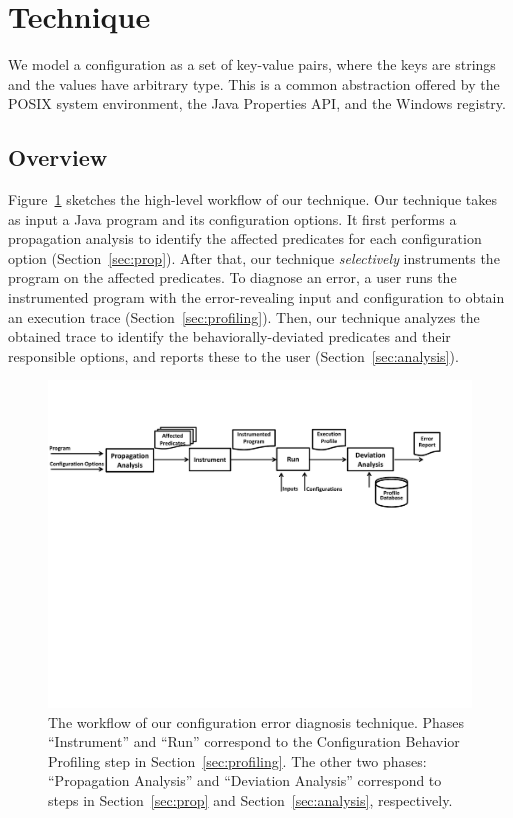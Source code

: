 \section{Technique}
\label{sec:technique}

We model a configuration as a set of key-value pairs, where
the keys are strings and the values have arbitrary type. This is
a common abstraction offered
by the POSIX system environment, the Java Properties API,
and the Windows registry.


\subsection{Overview}

Figure~\ref{fig:workflow} sketches the high-level workflow of our technique.
Our technique takes as input a Java program and its configuration options.
It first performs a propagation analysis to identify
the affected predicates for each configuration option (Section~\ref{sec:prop}).
After that, our technique \textit{selectively} instruments
the program on the affected predicates. 
To diagnose an error, a user runs the instrumented program
with the error-revealing input and configuration
to obtain an execution trace (Section~\ref{sec:profiling}).
Then, our technique analyzes the obtained trace
to identify the behaviorally-deviated predicates and their
responsible options, and reports these to the user (Section~\ref{sec:analysis}).




\begin{figure}[!]
  \centering
  \includegraphics[scale=0.600]{architecture}
  \vspace*{-2.0ex}\caption {{\label{fig:workflow} The workflow of our configuration error diagnosis technique.
Phases ``Instrument'' and ``Run'' correspond to the Configuration Behavior Profiling step in Section~\ref{sec:profiling}.
The other two phases: ``Propagation Analysis'' and ``Deviation Analysis'' correspond to steps in Section~\ref{sec:prop} and Section~\ref{sec:analysis}, respectively.
}}
\end{figure}

